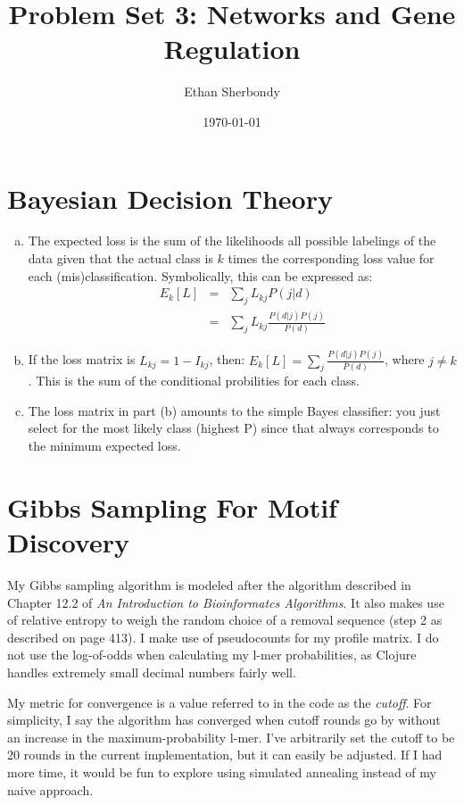 \documentclass{article}
\author{Ethan Sherbondy}
\date{\today}
\title{Problem Set 3: Networks and Gene Regulation}
\begin{document}
  
\maketitle  
\section{Bayesian Decision Theory}

\begin{enumerate}[(a)]
\item The expected loss is the sum of the likelihoods all possible labelings of the data given that the actual class is $k$ times the corresponding loss value for each (mis)classification. Symbolically, this can be expressed as:
\begin{align}
E_{k}[L] &=&  \sum_{j} L_{kj} P(j|d) \\
         &=& \sum_{j} L_{kj} \frac{P(d|j)P(j)}{P(d)}
\end{align}

\item If the loss matrix is $L_{kj} = 1 - I_{kj}$, then:
$E_{k}[L] = \sum_{j} \frac{P(d|j)P(j)}{P(d)}$, where $j \neq k$.
This is the sum of the conditional probilities for each class.

\item The loss matrix in part (b) amounts to the simple Bayes classifier: 
      you just select for the most likely class (highest P) 
      since that always corresponds to the minimum expected loss.

\end{enumerate}

\section{Gibbs Sampling For Motif Discovery}

My Gibbs sampling algorithm is modeled after the algorithm
described in Chapter 12.2 of \textit{An Introduction to Bioinformatcs Algorithms}. It also makes use of relative entropy to weigh the random choice of a removal sequence (step 2 as described on page 413). I make use of pseudocounts for my profile matrix. I do not use the log-of-odds when calculating my l-mer probabilities, as Clojure handles extremely small decimal numbers fairly well.

My metric for convergence is a value referred to in the code as the \textit{cutoff}. For simplicity, I say the algorithm has converged when cutoff rounds go by without an increase in the maximum-probability l-mer. I've arbitrarily set the cutoff to be 20 rounds in the current implementation, but it can easily be adjusted. If I had more time, it would be fun to explore using simulated annealing instead of my naive approach.
\end{document}
